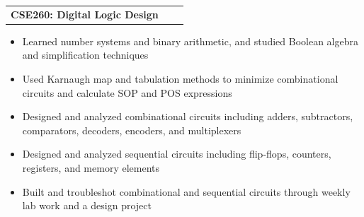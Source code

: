 \documentclass[a4paper,12pt]{article}
\makeatletter
\newenvironment{joblong}[2]
    {
    \begin{tabularx}{\linewidth}{@{}l X r@{}}
    \textbf{#1} & \hfill &  #2 \\[3.75pt]
    \end{tabularx}
    \begin{minipage}[t]{\linewidth}
    \begin{itemize}[nosep,after=\strut, leftmargin=1em, itemsep=3pt,label=--]
    }
    {
    \end{itemize}
    \end{minipage}    
    }
\makeatother
\begin{document}
\begin{joblong}{CSE260: Digital Logic Design}{}
	\item Learned number systems and binary arithmetic, and studied Boolean algebra and simplification techniques
	\item Used Karnaugh map and tabulation methods to minimize combinational circuits and calculate SOP and POS expressions
	\item Designed and analyzed combinational circuits including adders, subtractors, comparators, decoders, encoders, and multiplexers
	\item Designed and analyzed sequential circuits including flip-flops, counters, registers, and memory elements
	\item Built and troubleshot combinational and sequential circuits through weekly lab work and a design project
\end{joblong}


\end{document}
